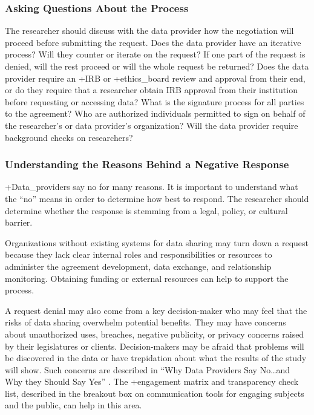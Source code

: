 \documentclass[
]{WileySix}
\begin{document}
\hypertarget{asking-questions-about-the-process}{%
\subsubsection{Asking Questions About the Process}\label{asking-questions-about-the-process}}

The researcher should discuss with the data provider how the negotiation will proceed before submitting the request. Does the data provider have an iterative process? Will they counter or iterate on the request? If one part of the request is denied, will the rest proceed or will the whole request be returned? Does the data provider require an +IRB\textbar{} or +ethics\_board\textbar{} review and approval from their end, or do they require that a researcher obtain IRB approval from their institution before requesting or accessing data? What is the signature process for all parties to the agreement? Who are authorized individuals permitted to sign on behalf of the researcher's or data provider's organization? Will the data provider require background checks on researchers?

\hypertarget{understanding-the-reasons-behind-a-negative-response}{%
\subsubsection{Understanding the Reasons Behind a Negative Response}\label{understanding-the-reasons-behind-a-negative-response}}

+Data\_providers\textbar{} say no for many reasons. It is important to understand what the ``no'' means in order to determine how best to respond. The researcher should determine whether the response is stemming from a legal, policy, or cultural barrier.

Organizations without existing systems for data sharing may turn down a request because they lack clear internal roles and responsibilities or resources to administer the agreement development, data exchange, and relationship monitoring. Obtaining funding or external resources can help to support the process.

A request denial may also come from a key decision-maker who may feel that the risks of data sharing overwhelm potential benefits. They may have concerns about unauthorized uses, breaches, negative publicity, or privacy concerns raised by their legislatures or clients. Decision-makers may be afraid that problems will be discovered in the data or have trepidation about what the results of the study will show. Such concerns are described in ``Why Data Providers Say No\ldots and Why they Should Say Yes'' \citep{nationalneighborhoodindicatorspartnershipnnip2018}. The +engagement\textbar{} matrix and transparency check list, described in the breakout box on communication tools for engaging subjects and the public, can help in this area.
\end{document}
